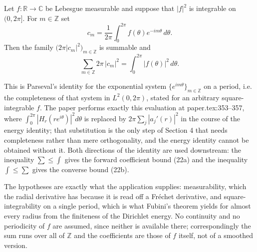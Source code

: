 \begin{lemma}
Let $f\colon\mathbb{R}\to\mathbb{C}$ be Lebesgue measurable and suppose that
$|f|^2$ is integrable on $(0,2\pi]$.  For $m\in\mathbb{Z}$ set
\[
  c_m=\frac1{2\pi}\int_0^{2\pi}f(\theta)e^{-im\theta}\,d\theta .
\]
Then the family $\bigl(2\pi|c_m|^2\bigr)_{m\in\mathbb{Z}}$ is summable and
\[
  \sum_{m\in\mathbb{Z}}2\pi\,|c_m|^2=\int_0^{2\pi}\bigl|f(\theta)\bigr|^2\,d\theta .
\]

This is Parseval's identity for the exponential system
$\{e^{im\theta}\}_{m\in\mathbb{Z}}$ on a period, i.e. the completeness of that
system in $L^2(0,2\pi)$, stated for an arbitrary square-integrable $f$.  The
paper performs exactly this evaluation at paper.tex:353--357, where
$\int_0^{2\pi}|H_r(re^{i\theta})|^2d\theta$ is replaced by
$2\pi\sum_{j}|a_j'(r)|^2$ in the course of the energy identity; that
substitution is the only step of Section 4 that needs completeness rather than
mere orthogonality, and the energy identity cannot be obtained without it.
Both directions of the identity are used downstream: the inequality
$\sum\le\int$ gives the forward coefficient bound (22a) and the inequality
$\int\le\sum$ gives the converse bound (22b).

The hypotheses are exactly what the application supplies: measurability, which
the radial derivative has because it is read off a Fréchet derivative, and
square-integrability on a single period, which is what Fubini's theorem yields
for almost every radius from the finiteness of the Dirichlet energy.  No
continuity and no periodicity of $f$ are assumed, since neither is available
there; correspondingly the sum runs over all of $\mathbb{Z}$ and the
coefficients are those of $f$ itself, not of a smoothed version.
\end{lemma}
